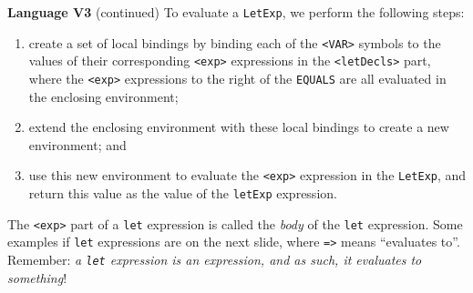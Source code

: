 \begin{minipage}[t]{\sw}
\slidenumber
\LARGE
{\bf Language V3} (continued)\exx
\Large
\emm{}\exx
\LARGE
To evaluate a \verb'LetExp', we perform the following steps:
\begin{enumerate}
\item
  create a set of local bindings
  by binding each of the \verb'<VAR>' symbols
  to the values of their corresponding \verb'<exp>' expressions
  in the \verb'<letDecls>' part,
  where the \verb'<exp>' expressions to the right
  of the \verb'EQUALS' are all evaluated
  in the enclosing environment;
\item
  extend the enclosing environment with these local bindings
  to create a new environment; and
\item
  use this new environment to evaluate the \verb'<exp>' expression
  in the \verb'LetExp', and return this value
  as the value of the \verb'letExp' expression.
\end{enumerate}
The \verb'<exp>' part of a \verb'let' expression
is called the {\em body} of the \verb'let' expression.\exx
Some examples if \verb'let' expressions are on the next slide,
where \verb'=>' means ``evaluates to''.
Remember: {\em a \verb'let' expression is an expression,
and as such, it evaluates to something}!
\end{minipage}
\clearpage
